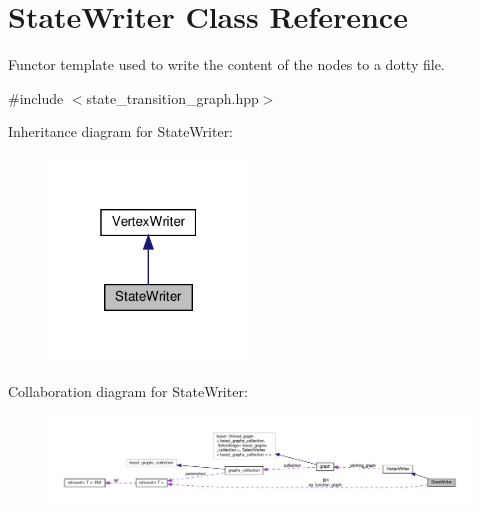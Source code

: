 \hypertarget{classStateWriter}{}\section{State\+Writer Class Reference}
\label{classStateWriter}


Functor template used to write the content of the nodes to a dotty file.  




{\ttfamily \#include $<$state\+\_\+transition\+\_\+graph.\+hpp$>$}



Inheritance diagram for State\+Writer\+:
\nopagebreak
\begin{figure}[H]
\begin{center}
\leavevmode
\includegraphics[width=151pt]{d6/df1/classStateWriter__inherit__graph}
\end{center}
\end{figure}


Collaboration diagram for State\+Writer\+:
\nopagebreak
\begin{figure}[H]
\begin{center}
\leavevmode
\includegraphics[width=350pt]{dd/dac/classStateWriter__coll__graph}
\end{center}
\end{figure}
